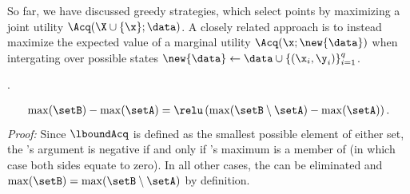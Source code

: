 
So far, we have discussed greedy strategies, which select points \x{} by maximizing a joint utility \(\Acq(\X \cup \{\x\}; \data)\). A closely related approach \temp{[cite]} is to instead maximize  the expected value of a marginal utility \(\Acq(\x; \new{\data})\) when intergating over possible states \(\new{\data} \gets \data \cup  \{(\x_{i},\y_{i})\}_{i=1}^{q}\).

.




\begin{align}
\max(\setB) - \max(\setA) = \relu\left(\max(\setB \setminus \setA) - \max(\setA)\right).
\label{eq:max_growth}
\end{align}
\emph{Proof:} Since \(\lboundAcq\) is defined as the smallest possible element of either set, the \relu's argument is negative if and only if \setB's maximum is a member of \setA{} (in which case both sides equate to zero). In all other cases, the \relu{} can be eliminated and \(\max(\setB) = \max(\setB \setminus \setA)\) by definition.


